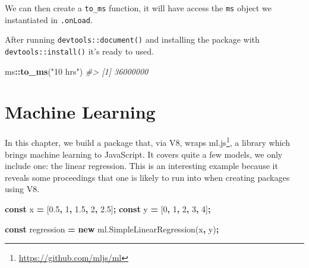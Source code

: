 \documentclass[
  10pt,
]{krantz}
\makeatletter
\newenvironment{Shaded}{\begin{snugshade}}{\end{snugshade}}
\newcommand{\AttributeTok}[1]{\textcolor[rgb]{0.61,0.61,0.61}{#1}}
\newcommand{\CommentTok}[1]{\textcolor[rgb]{0.37,0.37,0.37}{\textit{#1}}}
\newcommand{\ControlFlowTok}[1]{\textcolor[rgb]{0.27,0.27,0.27}{\textbf{#1}}}
\newcommand{\DecValTok}[1]{\textcolor[rgb]{0.06,0.06,0.06}{#1}}
\newcommand{\FloatTok}[1]{\textcolor[rgb]{0.06,0.06,0.06}{#1}}
\newcommand{\KeywordTok}[1]{\textcolor[rgb]{0.27,0.27,0.27}{\textbf{#1}}}
\newcommand{\NormalTok}[1]{#1}
\newcommand{\OperatorTok}[1]{\textcolor[rgb]{0.43,0.43,0.43}{\textbf{#1}}}
\newcommand{\StringTok}[1]{\textcolor[rgb]{0.5,0.5,0.5}{#1}}
\newcommand{\VariableTok}[1]{\textcolor[rgb]{0,0,0}{#1}}
\renewcommand{\href}[2]{#2\footnote{\url{#1}}}
\newenvironment{kframe}{%
\medskip{}
\setlength{\fboxsep}{.8em}
 \def\at@end@of@kframe{}%
 \ifinner\ifhmode%
  \def\at@end@of@kframe{\end{minipage}}%
  \begin{minipage}{\columnwidth}%
 \fi\fi%
 \def\FrameCommand##1{\hskip\@totalleftmargin \hskip-\fboxsep
 \colorbox{shadecolor}{##1}\hskip-\fboxsep
     \hskip-\linewidth \hskip-\@totalleftmargin \hskip\columnwidth}%
 \MakeFramed {\advance\hsize-\width
   \@totalleftmargin\z@ \linewidth\hsize
   \@setminipage}}%
 {\par\unskip\endMakeFramed%
 \at@end@of@kframe}
\renewenvironment{Shaded}{\begin{kframe}}{\end{kframe}}
\makeatother
\begin{document}
We can then create a \texttt{to\_ms} function, it will have access the \texttt{ms} object we instantiated in \texttt{.onLoad}.

\begin{Shaded}
\end{Shaded}

After running \texttt{devtools::document()} and installing the package with \texttt{devtools::install()} it's ready to used.

\begin{Shaded}
\begin{Highlighting}[]
\NormalTok{ms}\OperatorTok{::}\KeywordTok{to\_ms}\NormalTok{(}\StringTok{"10 hrs"}\NormalTok{)}
\CommentTok{\#> [1] 36000000}
\end{Highlighting}
\end{Shaded}

\hypertarget{v8-ml}{%
\chapter{Machine Learning}\label{v8-ml}}

In this chapter, we build a package that, via V8, wraps \href{https://github.com/mljs/ml}{ml.js}, a library which brings machine learning to JavaScript. It covers quite a few models, we only include one: the linear regression. This is an interesting example because it reveals some proceedings that one is likely to run into when creating packages using V8.

\begin{Shaded}
\begin{Highlighting}[]
\KeywordTok{const}\NormalTok{ x }\OperatorTok{=}\NormalTok{ [}\FloatTok{0.5}\OperatorTok{,} \DecValTok{1}\OperatorTok{,} \FloatTok{1.5}\OperatorTok{,} \DecValTok{2}\OperatorTok{,} \FloatTok{2.5}\NormalTok{]}\OperatorTok{;}
\KeywordTok{const}\NormalTok{ y }\OperatorTok{=}\NormalTok{ [}\DecValTok{0}\OperatorTok{,} \DecValTok{1}\OperatorTok{,} \DecValTok{2}\OperatorTok{,} \DecValTok{3}\OperatorTok{,} \DecValTok{4}\NormalTok{]}\OperatorTok{;}

\KeywordTok{const}\NormalTok{ regression }\OperatorTok{=} \KeywordTok{new} \VariableTok{ml}\NormalTok{.}\AttributeTok{SimpleLinearRegression}\NormalTok{(x}\OperatorTok{,}\NormalTok{ y)}\OperatorTok{;}
\end{Highlighting}
\end{Shaded}
\end{document}
